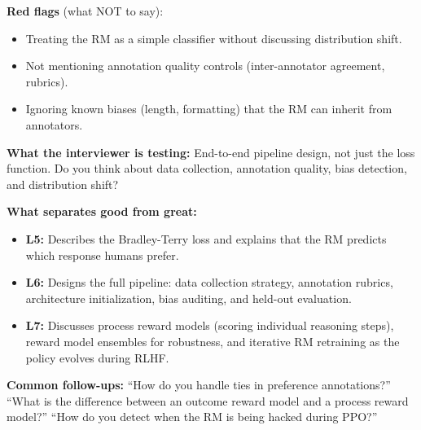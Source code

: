 \begin{interviewq}
\textbf{Red flags} (what NOT to say):
\begin{itemize}
    \item Treating the RM as a simple classifier without discussing distribution shift.
    \item Not mentioning annotation quality controls (inter-annotator agreement, rubrics).
    \item Ignoring known biases (length, formatting) that the RM can inherit from annotators.
\end{itemize}

\textbf{What the interviewer is testing:} End-to-end pipeline design, not just the loss function. Do you think about data collection, annotation quality, bias detection, and distribution shift?

\textbf{What separates good from great:}
\begin{itemize}
    \item \textbf{L5:} Describes the Bradley-Terry loss and explains that the RM predicts which response humans prefer.
    \item \textbf{L6:} Designs the full pipeline: data collection strategy, annotation rubrics, architecture initialization, bias auditing, and held-out evaluation.
    \item \textbf{L7:} Discusses process reward models (scoring individual reasoning steps), reward model ensembles for robustness, and iterative RM retraining as the policy evolves during RLHF.
\end{itemize}

\textbf{Common follow-ups:} ``How do you handle ties in preference annotations?'' ``What is the difference between an outcome reward model and a process reward model?'' ``How do you detect when the RM is being hacked during PPO?''
\end{interviewq}


